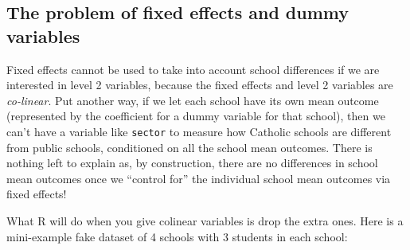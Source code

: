 \documentclass[
  letterpaper,
  DIV=11,
  numbers=noendperiod]{scrreprt}
\newenvironment{Shaded}{\begin{snugshade}}{\end{snugshade}}
\newcommand{\AttributeTok}[1]{\textcolor[rgb]{0.49,0.56,0.16}{#1}}
\newcommand{\DecValTok}[1]{\textcolor[rgb]{0.25,0.63,0.44}{#1}}
\newcommand{\FunctionTok}[1]{\textcolor[rgb]{0.02,0.16,0.49}{#1}}
\newcommand{\NormalTok}[1]{\textcolor[rgb]{0.00,0.44,0.13}{#1}}
\newcommand{\OtherTok}[1]{\textcolor[rgb]{0.00,0.44,0.13}{#1}}
\newcommand{\SpecialCharTok}[1]{\textcolor[rgb]{0.25,0.44,0.63}{#1}}
\begin{document}
\hypertarget{the-problem-of-fixed-effects-and-dummy-variables}{%
\subsection{The problem of fixed effects and dummy
variables}\label{the-problem-of-fixed-effects-and-dummy-variables}}

Fixed effects cannot be used to take into account school differences if
we are interested in level 2 variables, because the fixed effects and
level 2 variables are \emph{co-linear}. Put another way, if we let each
school have its own mean outcome (represented by the coefficient for a
dummy variable for that school), then we can't have a variable like
\texttt{sector} to measure how Catholic schools are different from
public schools, conditioned on all the school mean outcomes. There is
nothing left to explain as, by construction, there are no differences in
school mean outcomes once we ``control for'' the individual school mean
outcomes via fixed effects!

What R will do when you give colinear variables is drop the extra ones.
Here is a mini-example fake dataset of 4 schools with 3 students in each
school:

\begin{Shaded}
\end{Shaded}
\end{document}
